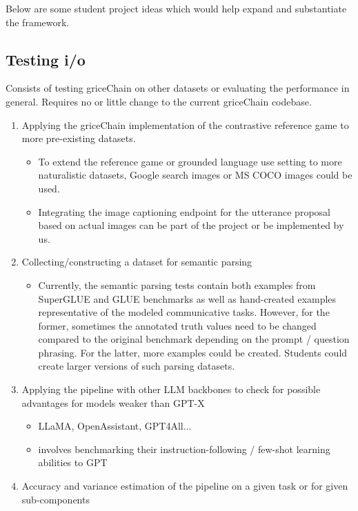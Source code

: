 \documentclass[fleqn,reqno,10pt]{article}
\begin{document}
Below are some student project ideas which would help expand and substantiate the framework.

\subsection{Testing i/o}

Consists of testing griceChain on other datasets or evaluating the performance in general. Requires no or little change to the current griceChain codebase.

\begin{enumerate}
  \item Applying the griceChain implementation of the contrastive reference game to more pre-existing datasets.
  \begin{itemize}
    \item To extend the reference game or grounded language use setting to more naturalistic datasets, Google search images or MS COCO images could be used.
    \item Integrating the image captioning endpoint for the utterance proposal based on actual images can be part of the project or be implemented by us.
  \end{itemize}
  \item Collecting/constructing a dataset for semantic parsing
  \begin{itemize}
    \item Currently, the semantic parsing tests contain both examples from SuperGLUE and GLUE benchmarks as well as hand-created examples representative of the modeled communicative tasks. However, for the former, sometimes the annotated truth values need to be changed compared to the original benchmark depending on the prompt / question phrasing. For the latter, more examples could be created. Students could create larger versions of such parsing datasets.
  \end{itemize}
  \item Applying the pipeline with other LLM backbones to check for possible advantages for models weaker than GPT-X
  \begin{itemize}
    \item LLaMA, OpenAssistant, GPT4All...
    \item involves benchmarking their instruction-following / few-shot learning abilities to GPT
  \end{itemize}
  \item Accuracy and variance estimation of the pipeline on a given task or for given sub-components

\end{enumerate}
\end{document}
